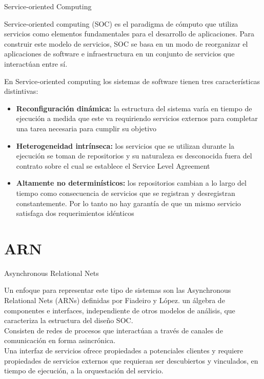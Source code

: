 \documentclass[10pt,xcolor={table,dvipsnames},t]{beamer}
\begin{document}
\begin{frame}{Service-oriented Computing}

Service-oriented computing (SOC) es el paradigma de cómputo que utiliza servicios como elementos fundamentales para el desarrollo de aplicaciones. Para construir este modelo de servicios, SOC se basa en un modo de reorganizar el aplicaciones de software e infraestructura en un conjunto de servicios que interactúan entre sí.

En Service-oriented computing los sistemas de software tienen tres características distintivas:
\begin{itemize}
  \item \textbf{Reconfiguración dinámica:} la estructura del sistema varía en tiempo de ejecución a medida que este va requiriendo servicios externos para completar una tarea necesaria para cumplir su objetivo

  \item \textbf{Heterogeneidad intrínseca:} los servicios que se utilizan durante la ejecución se toman de repositorios y su naturaleza es desconocida fuera del contrato sobre el cual se establece el Service Level Agreement
  
  \item \textbf{Altamente no determinísticos:} los repositorios cambian a lo largo del tiempo como consecuencia de servicios que se registran y desregistran constantemente. Por lo tanto no hay garantía de que un mismo servicio satisfaga dos requerimientos idénticos 

\end{itemize}

\end{frame}

\section{ARN}

\begin{frame}{Asynchronous Relational Nets}

Un enfoque para representar este tipo de sistemas son las Asynchronous Relational Nets (ARNs) definidas por Fiadeiro y López. un álgebra de componentes e interfaces, independiente de otros modelos de análisis, que caracteriza la estructura del diseño SOC.\\
Consisten de redes de procesos que interactúan a través de canales de comunicación en forma asincrónica.\\
Una interfaz de servicios ofrece propiedades a potenciales clientes y requiere propiedades de servicios externos que requieran ser descubiertos y vinculados, en tiempo de ejecución, a la orquestación del servicio.

\end{frame}
\end{document}
